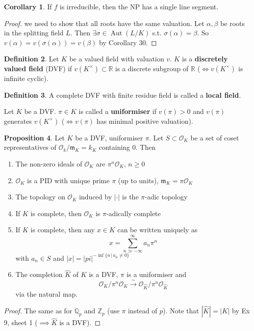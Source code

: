 \documentclass[a4paper]{article}
\theoremstyle{definition}
\newtheorem{definition}{Definition}
\theoremstyle{default}
\newtheorem{prop}[definition]{Proposition}
\newtheorem{corollary}[definition]{Corollary}
\theoremstyle{remark}
\newcommand*\abs[1]{\left|#1\right|}
\DeclareMathOperator{\Aut}{Aut}
\begin{document}
\begin{corollary}
	If $f$ is irreducible, then the NP has a single line segment.
\end{corollary}
\begin{proof}
	we need to show that all roots have the same valuation. Let $\alpha, \beta$ be roots in the splitting field $L$. Then $\exists \sigma \in \Aut(L/K)$ s.t. $\sigma(\alpha) = \beta$. So $v(\alpha)=v(\sigma(\alpha))=v(\beta)$ by Corollary 30.
\end{proof}

\begin{definition}
	Let $K$ be a valued field with valuation $v$. $K$ is a \textbf{discretely valued field} (DVF) if $v(K^\times)\subset \mathbb{R}$ is a discrete subgroup of $\mathbb{R}$ ($\iff v(K^\times)$ is infinite cyclic).
\end{definition}

\begin{definition}
	A complete DVF with finite residue field is called a \textbf{local field}.
\end{definition}

Let $K$ be a DVF. $\pi \in K$ is called a \textbf{uniformiser} if $v(\pi) > 0$ and $v(\pi)$ generates $v(K^\times)$ ($\iff v(\pi)$ has minimal positive valuation).

\begin{prop}
	Let $K$ be a DVF, uniformiser $\pi$. Let $S \subset \mathcal{O}_K$ be a set of coset representatives of $\mathcal{O}_k/\mathfrak{m}_K = k_K$ containing 0. Then
	\begin{enumerate}
		\item The non-zero ideals of $\mathcal{O}_K$ are $\pi^n\mathcal{O}_K$, $n \geq 0$
		\item $\mathcal{O}_K$ is a PID with unique prime $\pi$ (up to units), $\mathfrak{m}_K=\pi\mathcal{O}_K$
		\item The topology on $\mathcal{O}_K$ induced by $\abs{\cdot}$ is the $\pi$-adic topology
		\item If $K$ is complete, then $\mathcal{O}_K$ is $\pi$-adically complete
		\item If $K$ is complete, then any $x \in K$ can be written uniquely as
		$$ x = \sum_{n \gg -\infty}^{\infty} a_n \pi^n$$
		with $a_n \in S$ and $\abs{x} = \abs{pi}^{-\inf\{n \,|\, a_n \neq 0\}}$
		\item The completion $\hat{K}$ of $K$ is a DVF, $\pi$ is a uniformiser and 
		$$\mathcal{O}_K/\pi^n\mathcal{O}_K \overset{\sim}{\longrightarrow} \mathcal{O}_{\hat{K}}/\pi^n\mathcal{O}_{\hat{K}}$$
		via the natural map.
	\end{enumerate}
\end{prop}
\begin{proof}
	The same as for $\mathbb{Q}_p$ and $\mathbb{Z}_p$ (use $\pi$ instead of $p$). 
	Note that $\abs{\hat{K}} = \abs{K}$ by Ex 9, sheet 1 ($\implies \hat{K}$ is a DVF).
\end{proof}
\end{document}
